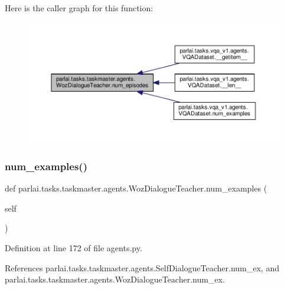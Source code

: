 Here is the caller graph for this function\+:
\nopagebreak
\begin{figure}[H]
\begin{center}
\leavevmode
\includegraphics[width=350pt]{classparlai_1_1tasks_1_1taskmaster_1_1agents_1_1WozDialogueTeacher_a5f8ae65ad372deb60a3ecc5ae2ecb2fa_icgraph}
\end{center}
\end{figure}
\mbox{\label{classparlai_1_1tasks_1_1taskmaster_1_1agents_1_1WozDialogueTeacher_ab2a75e925793c94516941b46b736d32c}} 
\subsubsection{\texorpdfstring{num\+\_\+examples()}{num\_examples()}}
{\footnotesize\ttfamily def parlai.\+tasks.\+taskmaster.\+agents.\+Woz\+Dialogue\+Teacher.\+num\+\_\+examples (\begin{DoxyParamCaption}\item[{}]{self }\end{DoxyParamCaption})}



Definition at line 172 of file agents.\+py.



References parlai.\+tasks.\+taskmaster.\+agents.\+Self\+Dialogue\+Teacher.\+num\+\_\+ex, and parlai.\+tasks.\+taskmaster.\+agents.\+Woz\+Dialogue\+Teacher.\+num\+\_\+ex.



